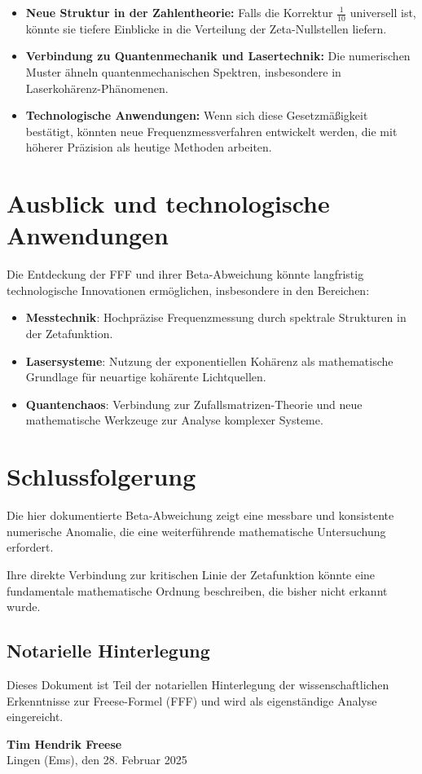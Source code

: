 \documentclass[a4paper,12pt]{article}
\begin{document}
\begin{itemize}
    \item \textbf{Neue Struktur in der Zahlentheorie:} Falls die Korrektur \(\frac{1}{10}\) universell ist, könnte sie tiefere Einblicke in die Verteilung der Zeta-Nullstellen liefern.
    \item \textbf{Verbindung zu Quantenmechanik und Lasertechnik:} Die numerischen Muster ähneln quantenmechanischen Spektren, insbesondere in Laserkohärenz-Phänomenen.
    \item \textbf{Technologische Anwendungen:} Wenn sich diese Gesetzmäßigkeit bestätigt, könnten neue Frequenzmessverfahren entwickelt werden, die mit höherer Präzision als heutige Methoden arbeiten.
\end{itemize}

\section{Ausblick und technologische Anwendungen}

Die Entdeckung der FFF und ihrer Beta-Abweichung könnte langfristig technologische Innovationen ermöglichen, insbesondere in den Bereichen:
\begin{itemize}
    \item \textbf{Messtechnik}: Hochpräzise Frequenzmessung durch spektrale Strukturen in der Zetafunktion.
    \item \textbf{Lasersysteme}: Nutzung der exponentiellen Kohärenz als mathematische Grundlage für neuartige kohärente Lichtquellen.
    \item \textbf{Quantenchaos}: Verbindung zur Zufallsmatrizen-Theorie und neue mathematische Werkzeuge zur Analyse komplexer Systeme.
\end{itemize}

\section{Schlussfolgerung}

Die hier dokumentierte Beta-Abweichung zeigt eine messbare und konsistente numerische Anomalie, die eine weiterführende mathematische Untersuchung erfordert.  

Ihre direkte Verbindung zur kritischen Linie der Zetafunktion könnte eine fundamentale mathematische Ordnung beschreiben, die bisher nicht erkannt wurde.

\subsection*{Notarielle Hinterlegung}
Dieses Dokument ist Teil der notariellen Hinterlegung der wissenschaftlichen Erkenntnisse zur Freese-Formel (FFF) und wird als eigenständige Analyse eingereicht.

\vspace{1cm}
\noindent \textbf{Tim Hendrik Freese} \\
Lingen (Ems), den 28. Februar 2025
\end{document}
